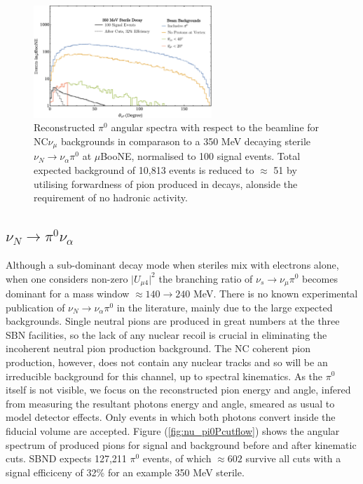 \documentclass[11pt, a4paper]{article}
\begin{document}
\begin{figure}[h]
\center
\includegraphics[width=0.6\textwidth,clip,trim=0 0 0 0]{figures/nu_pi0_cutflow.pdf}
\caption{\label{fig:nu_pi0_cutflow} Reconstructed $\pi^0$ angular spectra with respect to the beamline for NC$\nu_\mu$ backgrounds in comparason to a 350 MeV decaying sterile $\nu_N \rightarrow \nu_\alpha \pi^0$ at $\mu$BooNE, normalised to 100 signal events. Total expected background of 10,813 events is reduced to $\approx$ 51 by utilising forwardness of pion produced in decays, alonside the requirement of no hadronic activity. }

\end{figure}

\subsection{$\nu_N \rightarrow \pi^0 \nu_\alpha$}
Although a sub-dominant decay mode when steriles mix with electrons alone, when one considers non-zero $\vert U_{\mu4}\vert^2$ the branching ratio of $\nu_s \rightarrow \nu_\mu \pi^0$ becomes dominant for a mass window $\approx 140 \rightarrow 240$ MeV. There is no known experimental publication of $\nu_N \rightarrow \nu_\alpha \pi^0$ in the literature, mainly due to the large expected backgrounds. Single neutral pions are produced in great numbers at the three SBN facilities, so the lack of any nuclear recoil is crucial in eliminating the incoherent neutral pion production background. The NC coherent pion production, however, does not contain any nuclear tracks and so will be an irreducible background for this channel, up to spectral kinematics. As the $\pi^0$ itself is not visible, we focus on the reconstructed pion energy and angle, infered from measuring the resultant photons energy and angle, smeared as usual to model detector effects. Only events in which both photons convert inside the fiducial volume are accepted. Figure (\ref{fig:nu_pi0Pcutflow}) shows the angular spectrum of produced pions for signal and background before and after kinematic cuts. SBND expects 127,211 $\pi^0$ events, of which $\approx 602$ survive all cuts with a signal efficiceny of 32\% for an example 350 MeV sterile. \\ 
\end{document}
